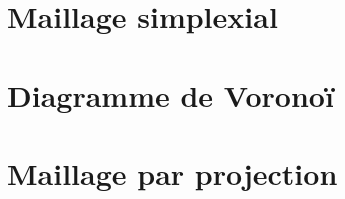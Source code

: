 \medskip
\section{Maillage simplexial}




\medskip
\section{Diagramme de Voronoï}



\medskip
\section{Maillage par projection}

